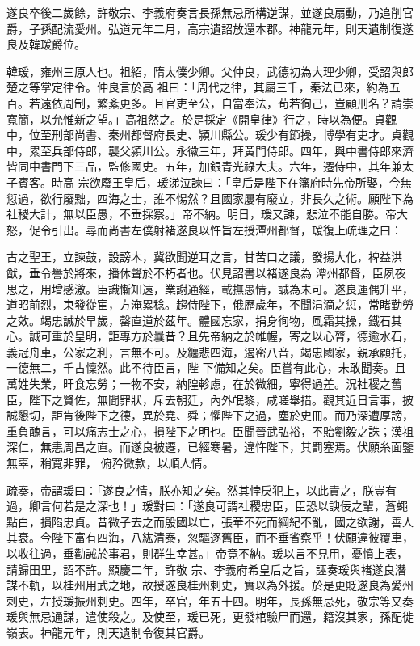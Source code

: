 \begin{pinyinscope}
 遂良卒後二歲餘，許敬宗、李義府奏言長孫無忌所構逆謀，並遂良扇動，乃追削官爵，子孫配流愛州。弘道元年二月，高宗遺詔放還本郡。神龍元年，則天遺制復遂良及韓瑗爵位。



 韓瑗，雍州三原人也。祖紹，隋太僕少卿。父仲良，武德初為大理少卿，受詔與郎楚之等掌定律令。仲良言於高
 祖曰：「周代之律，其屬三千，秦法已來，約為五百。若遠依周制，繁紊更多。且官吏至公，自當奉法，茍若徇己，豈顧刑名？請崇寬簡，以允惟新之望。」高祖然之。於是採定《開皇律》行之，時以為便。貞觀中，位至刑部尚書、秦州都督府長史、潁川縣公。瑗少有節操，博學有吏才。貞觀中，累至兵部侍郎，襲父潁川公。永徽三年，拜黃門侍郎。四年，與中書侍郎來濟皆同中書門下三品，監修國史。五年，加銀青光祿大夫。六年，遷侍中，其年兼太子賓客。時高
 宗欲廢王皇后，瑗涕泣諫曰：「皇后是陛下在籓府時先帝所娶，今無愆過，欲行廢黜，四海之士，誰不惕然？且國家屢有廢立，非長久之術。願陛下為社稷大計，無以臣愚，不垂採察。」帝不納。明日，瑗又諫，悲泣不能自勝。帝大怒，促令引出。尋而尚書左僕射褚遂良以忤旨左授潭州都督，瑗復上疏理之曰：



 古之聖王，立諫鼓，設謗木，冀欲聞逆耳之言，甘苦口之議，發揚大化，裨益洪猷，垂令譽於將來，播休聲於不朽者也。伏見詔書以褚遂良為
 潭州都督，臣夙夜思之，用增感激。臣識慚知遠，業謝通經，載撫愚情，誠為未可。遂良運偶升平，道昭前烈，束發從宦，方淹累稔。趨侍陛下，俄歷歲年，不聞涓滴之愆，常睹勤勞之效。竭忠誠於早歲，罄直道於茲年。體國忘家，捐身徇物，風霜其操，鐵石其心。誠可重於皇明，詎專方於曩昔？且先帝納之於帷幄，寄之以心膂，德逾水石，義冠舟車，公家之利，言無不可。及纏悲四海，遏密八音，竭忠國家，親承顧托，一德無二，千古懍然。此不待臣言，陛
 下備知之矣。臣嘗有此心，未敢聞奏。且萬姓失業，旰食忘勞；一物不安，納隍軫慮，在於微細，寧得過差。況社稷之舊臣，陛下之賢佐，無聞罪狀，斥去朝廷，內外氓黎，咸嗟舉措。觀其近日言事，披誠懇切，詎肯後陛下之德，異於堯、舜；懼陛下之過，塵於史冊。而乃深遭厚謗，重負醜言，可以痛志士之心，損陛下之明也。臣聞晉武弘裕，不貽劉毅之誅；漢祖深仁，無恚周昌之直。而遂良被遷，已經寒暑，違忤陛下，其罰塞焉。伏願糸面鑒無辜，稍寬非罪，
 俯矜微款，以順人情。



 疏奏，帝謂瑗曰：「遂良之情，朕亦知之矣。然其悖戾犯上，以此責之，朕豈有過，卿言何若是之深也！」瑗對曰：「遂良可謂社稷忠臣，臣恐以諛佞之輩，蒼蠅點白，損陷忠貞。昔微子去之而殷國以亡，張華不死而綱紀不亂，國之欲謝，善人其衰。今陛下富有四海，八紘清泰，忽驅逐舊臣，而不垂省察乎！伏願違彼覆車，以收往過，垂勸誡於事君，則群生幸甚。」帝竟不納。瑗以言不見用，憂憤上表，請歸田里，詔不許。顯慶二年，許敬
 宗、李義府希皇后之旨，誣奏瑗與褚遂良潛謀不軌，以桂州用武之地，故授遂良桂州刺史，實以為外援。於是更貶遂良為愛州刺史，左授瑗振州刺史。四年，卒官，年五十四。明年，長孫無忌死，敬宗等又奏瑗與無忌通謀，遣使殺之。及使至，瑗已死，更發棺驗尸而還，籍沒其家，孫配徙嶺表。神龍元年，則天遺制令復其官爵。




\end{pinyinscope}
